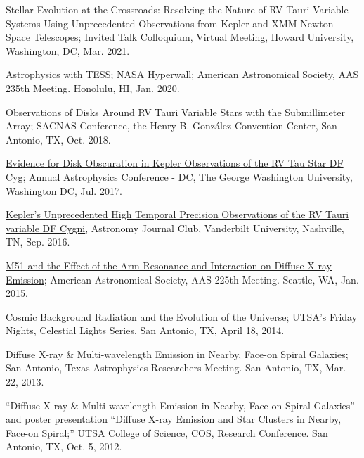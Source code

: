 \documentclass[letter,11pt]{article}
\begin{document}
\begin{etaremune}
\item Stellar Evolution at the Crossroads: Resolving the Nature of RV Tauri Variable Systems Using Unprecedented Observations from Kepler and XMM-Newton Space Telescopes; Invited Talk Colloquium, Virtual Meeting, Howard University, Washington, DC, Mar. 2021.

\item Astrophysics with TESS; NASA Hyperwall; American Astronomical Society, AAS 235th Meeting.  Honolulu, HI, Jan. 2020.

\item Observations of Disks Around RV Tauri Variable Stars with the Submillimeter Array; SACNAS Conference, the Henry B. Gonz\'alez Convention Center, San Antonio, TX, Oct. 2018.

\item \href{https://physics.columbian.gwu.edu/sites/g/files/zaxdzs1976/f/downloads/ACDC2017_Agenda_0.pdf}{Evidence for Disk Obscuration in Kepler Observations of the RV Tau Star DF Cyg};  Annual Astrophysics Conference - DC, The George Washington University, Washington DC, Jul. 2017.

\item \href{https://as.vanderbilt.edu/astronomy/2016/08/journal-club-fall-2016/}{Kepler's Unprecedented High Temporal Precision Observations of the RV Tauri variable DF Cygni}, Astronomy Journal Club, Vanderbilt University, Nashville, TN, Sep. 2016.

\item \href{http://adsabs.harvard.edu/abs/2015AAS...22522708V}{M51 and the Effect of the Arm Resonance and Interaction on Diffuse X-ray Emission}; American Astronomical Society, AAS 225th Meeting. Seattle, WA, Jan. 2015.

\item \href{http://www.utsa.edu/today/2014/04/celestiallights4.html}{Cosmic Background Radiation and the Evolution of the Universe}; UTSA’s Friday Nights, Celestial Lights Series. San Antonio, TX, April 18, 2014.

\item Diffuse X-ray \& Multi-wavelength Emission in Nearby, Face-on Spiral Galaxies; San Antonio, Texas Astrophysics Researchers Meeting. San Antonio, TX, Mar. 22, 2013.

\item “Diffuse X-ray \& Multi-wavelength Emission in Nearby, Face-on Spiral Galaxies” and poster presentation “Diffuse X-ray Emission and Star Clusters in Nearby, Face-on Spiral;” UTSA College of Science, COS, Research Conference. San Antonio, TX, Oct. 5, 2012.

\end{etaremune}
\end{document}
